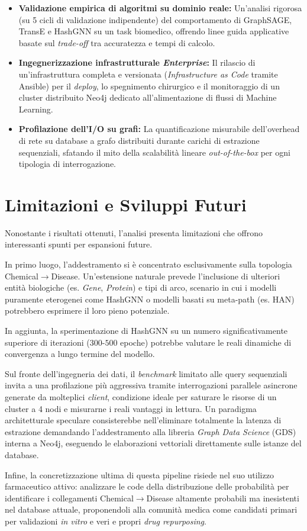 \begin{itemize}
    \item \textbf{Validazione empirica di algoritmi su dominio reale:} Un'analisi rigorosa (su 5 cicli di validazione indipendente) del comportamento di GraphSAGE, TransE e HashGNN su un task biomedico, offrendo linee guida applicative basate sul \textit{trade-off} tra accuratezza e tempi di calcolo.
    \item \textbf{Ingegnerizzazione infrastrutturale \textit{Enterprise}:} Il rilascio di un'infrastruttura completa e versionata (\textit{Infrastructure as Code} tramite Ansible) per il \textit{deploy}, lo spegnimento chirurgico e il monitoraggio di un cluster distribuito Neo4j dedicato all'alimentazione di flussi di Machine Learning.
    \item \textbf{Profilazione dell'I/O su grafi:} La quantificazione misurabile dell'overhead di rete su database a grafo distribuiti durante carichi di estrazione sequenziali, sfatando il mito della scalabilità lineare \textit{out-of-the-box} per ogni tipologia di interrogazione.
\end{itemize}

\section{Limitazioni e Sviluppi Futuri}
Nonostante i risultati ottenuti, l'analisi presenta limitazioni che offrono interessanti spunti per espansioni future. 

In primo luogo, l'addestramento si è concentrato esclusivamente sulla topologia \\ Chemical$\to$Disease. Un'estensione naturale prevede l'inclusione di ulteriori entità biologiche (es. \textit{Gene}, \textit{Protein}) e tipi di arco, scenario in cui i modelli puramente eterogenei come HashGNN o modelli basati su meta-path (es. HAN) \cite{wang2019heterogeneous} potrebbero esprimere il loro pieno potenziale.

In aggiunta, la sperimentazione di HashGNN su un numero significativamente superiore di iterazioni ($300$-$500$ epoche) potrebbe valutare le reali dinamiche di convergenza a lungo termine del modello.

Sul fronte dell'ingegneria dei dati, il \textit{benchmark} limitato alle query sequenziali invita a una profilazione più aggressiva tramite interrogazioni parallele asincrone generate da molteplici \textit{client}, condizione ideale per saturare le risorse di un cluster a 4 nodi e misurarne i reali vantaggi in lettura. Un paradigma architetturale speculare consisterebbe nell'eliminare totalmente la latenza di estrazione demandando l'addestramento alla libreria \textit{Graph Data Science} (GDS) interna a Neo4j, eseguendo le elaborazioni vettoriali direttamente sulle istanze del database.

Infine, la concretizzazione ultima di questa pipeline risiede nel suo utilizzo farmaceutico attivo: analizzare le code della distribuzione delle probabilità per identificare i collegamenti Chemical$\to$Disease altamente probabili ma inesistenti nel database attuale, proponendoli alla comunità medica come candidati primari per validazioni \textit{in vitro} e veri e propri \textit{drug repurposing}.